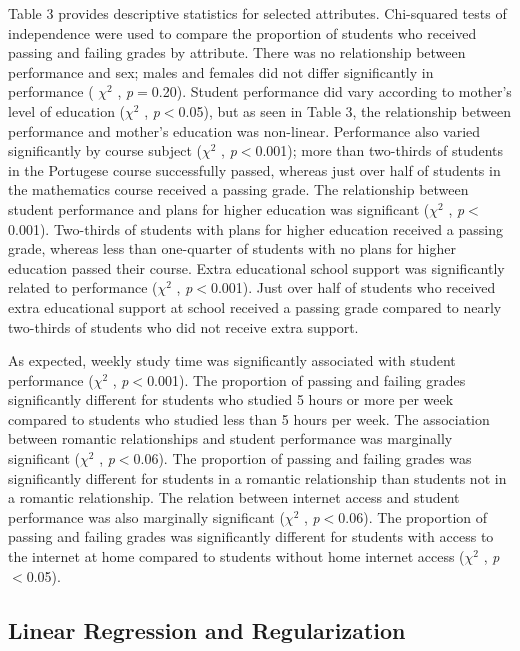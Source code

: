 \documentclass[sigconf]{acmart}
\begin{document}
Table 3 provides descriptive statistics for selected attributes. Chi-squared 
tests of independence were used to compare the proportion of students who 
received passing and failing grades by attribute. There was no relationship
between performance and sex; males and females did not differ significantly 
in performance ( $\chi^2$ , \textit{p}$=$0.20). Student performance did vary
according to mother's level of education ($\chi^2$ , \textit{p}$<$0.05), but 
as seen in Table 3, the relationship between performance and mother's 
education was non-linear. Performance also varied significantly by course 
subject ($\chi^2$ , \textit{p}$<$0.001); more than two-thirds of students in 
the Portugese course successfully passed, whereas just over half of students 
in the mathematics course received a passing grade. The relationship between 
student performance and plans for higher education was significant 
($\chi^2$ , \textit{p}$<$0.001). Two-thirds of students with plans for 
higher education received a passing grade, whereas less than one-quarter of 
students with no plans for higher education passed their course. Extra 
educational school support was significantly related to performance 
($\chi^2$ , \textit{p}$<$0.001). Just over half of students who received 
extra educational support at school received a passing grade compared to 
nearly two-thirds of students who did not receive extra support. 

As expected, weekly study time was significantly associated with student 
performance ($\chi^2$ , \textit{p}$<$0.001). The proportion of passing and 
failing grades significantly different for students who studied 5 hours or 
more per week compared to students who studied less than 5 hours per week. 
The association between romantic relationships and student performance 
was marginally significant ($\chi^2$ , \textit{p}$<$0.06). The proportion 
of passing and failing grades was significantly different for students in 
a romantic relationship than students not in a romantic relationship. The 
relation between internet access and student performance was also marginally 
significant ($\chi^2$ , \textit{p}$<$0.06). The proportion of passing and
failing grades was significantly different for students with access to the 
internet at home compared to students without home internet access 
($\chi^2$ , \textit{p}$<$0.05).


\subsection{Linear Regression and Regularization}
\end{document}
